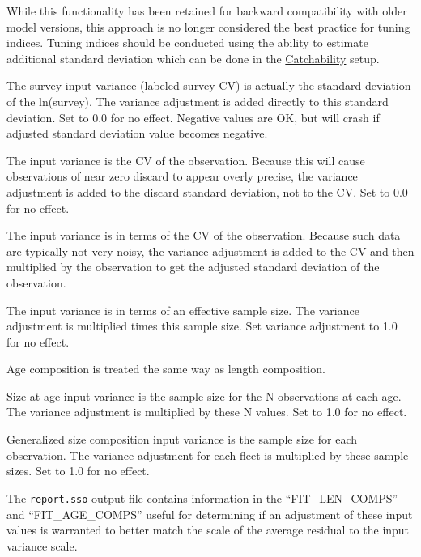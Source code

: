 While this functionality has been retained for backward compatibility with older model versions, this approach is no longer considered the best practice for tuning indices. Tuning indices should be conducted using the ability to estimate additional standard deviation which can be done in the \hyperlink{Qsetup}{Catchability} setup.   

The survey input variance (labeled survey CV) is actually the standard deviation of the ln(survey). The variance adjustment is added directly to this standard deviation. Set to 0.0 for no effect. Negative values are OK, but will crash if adjusted standard deviation value becomes negative.

The input variance is the CV of the observation. Because this will cause observations of near zero discard to appear overly precise, the variance adjustment is added to the discard standard deviation, not to the CV. Set to 0.0 for no effect.

The input variance is in terms of the CV of the observation. Because such data are typically not very noisy, the variance adjustment is added to the CV and then multiplied by the observation to get the adjusted standard deviation of the observation.

The input variance is in terms of an effective sample size. The variance adjustment is multiplied times this sample size. Set variance adjustment to 1.0 for no effect.

Age composition is treated the same way as length composition.
	
Size-at-age input variance is the sample size for the N observations at each age. The variance adjustment is multiplied by these N values. Set to 1.0 for no effect.
	
Generalized size composition input variance is the sample size for each observation. The variance adjustment for each fleet is multiplied by these sample sizes. Set to 1.0 for no effect.
		
The \verb|report.sso| output file contains information in the ``FIT\_LEN\_COMPS'' and ``FIT\_AGE\_COMPS''  useful for determining if an adjustment of these input values is warranted to better match the scale of the average residual to the input variance scale.
	

